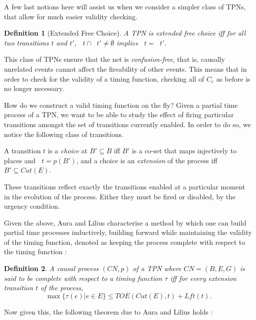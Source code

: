 \documentclass[conference]{IEEEtran}
\DeclareMathOperator*{\pre}{^\bullet}
\newtheorem{definition}{Definition}
\begin{document}
A few last notions here will assist us when we consider a simpler class of TPNs, that allow for much easier validity checking. 

\begin{definition}[Extended Free Choice]\label{efc} A TPN is \textit{extended free choice} iff for all two transitions $t$ and $t'$, $\pre t \cap \pre t' \neq \emptyset$ implies $\pre t = \pre t'.$
\end{definition}

This class of TPNs ensure that the net is \textit{confusion-free}, that is, causally unrelated events cannot affect the fireability of other events. 
This means that in order to check for the validity of a timing function, checking all of $C_e$ as before is no longer necessary. 

How do we construct a valid timing function on the fly? 
Given a partial time process of a TPN, we want to be able to study the effect of firing particular transitions amongst the set of transitions currently enabled. 
In order to do so, we notice the following class of transitions. 

A transition $t$ is a \textit{choice} at $B' \subseteq B$ iff $B'$ is a co-set that maps injectively to places and $\pre t = p(B')$, and a choice is an \textit{extension} of the process iff $B' \subseteq Cut(E)$. 

These transitions reflect exactly the transitions enabled at a particular moment in the evolution of the process. Either they must be fired or disabled, by the urgency condition. 

Given the above, Aura and Lilius characterise a method by which one can build partial time processes inductively, building forward while maintaining the validity of the timing function, denoted as keeping the process complete with respect to the timing function : 

\begin{definition} A causal process $(CN, p)$ of a TPN where $CN = (B, E, G)$ is said to be \textit{complete} with respect to a timing function $\tau$ iff for every extension transition $t$ of the process, $$\max\{\tau(e)| e \in E\} \leq TOE(Cut(E), t) + Lft(t).$$
\end{definition}

Now given this, the following theorem due to Aura and Lilius \cite{AL97} holds : 
\end{document}
